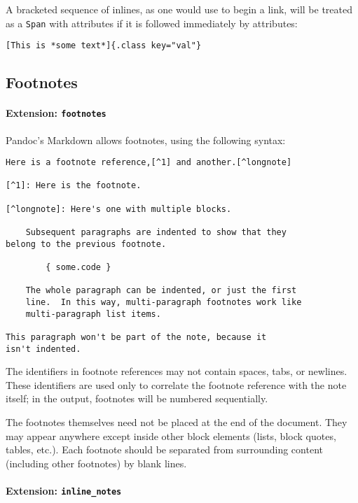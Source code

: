 \documentclass[
  a4paper,
]{article}
\begin{document}
A bracketed sequence of inlines, as one would use to begin a link, will
be treated as a \texttt{Span} with attributes if it is followed
immediately by attributes:

\begin{verbatim}
[This is *some text*]{.class key="val"}
\end{verbatim}

\hypertarget{footnotes}{%
\subsection{Footnotes}\label{footnotes}}

\hypertarget{extension-footnotes}{%
\paragraph{\texorpdfstring{Extension:
\texttt{footnotes}}{Extension: footnotes}}\label{extension-footnotes}}

Pandoc's Markdown allows footnotes, using the following syntax:

\begin{verbatim}
Here is a footnote reference,[^1] and another.[^longnote]

[^1]: Here is the footnote.

[^longnote]: Here's one with multiple blocks.

    Subsequent paragraphs are indented to show that they
belong to the previous footnote.

        { some.code }

    The whole paragraph can be indented, or just the first
    line.  In this way, multi-paragraph footnotes work like
    multi-paragraph list items.

This paragraph won't be part of the note, because it
isn't indented.
\end{verbatim}

The identifiers in footnote references may not contain spaces, tabs, or
newlines. These identifiers are used only to correlate the footnote
reference with the note itself; in the output, footnotes will be
numbered sequentially.

The footnotes themselves need not be placed at the end of the document.
They may appear anywhere except inside other block elements (lists,
block quotes, tables, etc.). Each footnote should be separated from
surrounding content (including other footnotes) by blank lines.

\hypertarget{extension-inline_notes}{%
\paragraph{\texorpdfstring{Extension:
\texttt{inline\_notes}}{Extension: inline\_notes}}\label{extension-inline_notes}}
\end{document}
